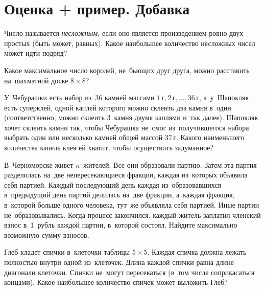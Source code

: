 
\section*{Оценка + пример. Добавка}


\begin{problems}

\item
Число называется \emph{несложным,} если оно является произведением ровно двух
простых (быть может, равных).
Какое наибольшее количество несложных чисел может идти подряд?

\item
Какое максимальное число королей, не~бьющих друг друга, можно расставить
на~шахматной доске $8 \times 8$?

\item
У~Чебурашки есть набор из~36 камней массами
$1\,\text{г}, 2\,\text{г}, \ldots, 36\,\text{г}$,
а~у~Шапокляк есть суперклей, одной каплей которого можно склеить два камня
в~один (соответственно, можно склеить 3~камня двумя каплями и~так далее).
Шапокляк хочет склеить камни так, чтобы Чебурашка не~смог из~получившегося
набора выбрать один или несколько камней общей массой $37\,\text{г}$.
Какого наименьшего количества капель клея ей хватит, чтобы осуществить
задуманное?

\item
В~Черноморске живет $n$~жителей.
Все они образовали партию.
Затем эта партия разделилась на~две непересекающиеся фракции, каждая из~которых
объявила себя партией.
Каждый последующий день каждая из~образовавшихся в~предыдущий день партий
делилась на~две фракции, а~каждая фракция, в~которой больше одного человека,
тут~же объявляла себя партией.
Иные партии не~образовывались.
Когда процесс закончился, каждый житель заплатил членский взнос в~1~рубль
каждой партии, в~которой состоял.
Найдите максимально возможную сумму взносов.

\item
Глеб кладет спички в~клеточки таблицы $5 \times 5$.
Каждая спичка должна лежать полностью внутри одной из~клеточек.
Длина каждой спички равна длине диагонали клеточки.
Спички не~могут пересекаться (в~том числе соприкасаться концами).
Какое наибольшее количество спичек может выложить Глеб?

\end{problems}

